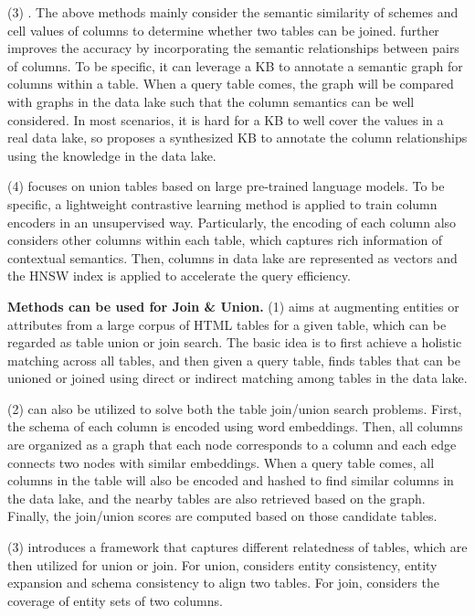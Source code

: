   \noindent  (3) \santos. The above methods mainly consider  the semantic similarity of  schemes and cell values of columns to determine whether two tables can be joined.
   \santos further improves the accuracy by incorporating the semantic relationships between pairs of columns. To be specific,  it can leverage a KB to annotate a semantic graph for columns within a table. When a query table comes, the graph will be compared with graphs in the data lake such that the column semantics can be well considered. In most scenarios, it is hard for a KB to well cover the values in a real data lake, so \santos proposes a synthesized KB to annotate the column relationships using the knowledge in the data lake. 
 


 \noindent (4) \starmie focuses on union tables based on large  pre-trained language models. To be specific, a lightweight contrastive learning method is applied to train column encoders in an unsupervised way. Particularly, the encoding of each column also considers other columns within each table, which captures rich information of contextual semantics.
  Then, columns in data lake are represented as vectors and the HNSW index is applied to accelerate the query efficiency. 


\noindent\textbf{Methods can be used for Join \& Union.}
  (1) \infogather aims at augmenting entities or attributes from a large corpus of HTML tables for a given table, which can be regarded as table union or join search. The basic idea is to first achieve a holistic matching across all tables, and then  given a query table,  \infogather finds tables that can be unioned or joined using direct or indirect matching among tables in the data lake. 

 
  \noindent  (2) \aurum can also be utilized to solve  both the table join/union search problems. First, the schema of each column is encoded using word embeddings. Then, all columns are organized as a graph that each node corresponds to a column and each edge connects two nodes with similar embeddings. When a query table comes, all columns in the table will also be encoded and hashed to find similar columns in the data lake, and  the nearby tables are also retrieved based on the graph. Finally, the join/union scores are computed based on those candidate tables.   
  
 \noindent  (3) \cc{\frt} introduces a framework that captures different relatedness of tables, which are then utilized for union or join.
  For union,  \frt considers entity consistency, entity expansion and schema consistency to align two tables. For join, \frt considers the coverage of entity sets of two columns. 

